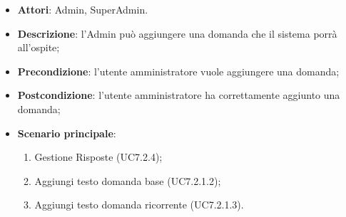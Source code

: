 \documentclass[../AnalisiDeiRequisiti_v3.0.0.tex]{subfiles}
\begin{document}
\begin{itemize} 
\item \textbf{Attori}: Admin, SuperAdmin.
\item \textbf{Descrizione}: l'Admin può aggiungere una domanda che il sistema porrà all'ospite;
\item \textbf{Precondizione}: l'utente amministratore vuole aggiungere una domanda;
\item \textbf{Postcondizione}: l'utente amministratore ha correttamente aggiunto una domanda;
\item \textbf{Scenario principale}: \begin{enumerate}\item Gestione Risposte (UC7.2.4);\item Aggiungi testo domanda base (UC7.2.1.2);\item Aggiungi testo domanda ricorrente (UC7.2.1.3).
\end{enumerate}
\newpage

\end{itemize}
\end{document}
